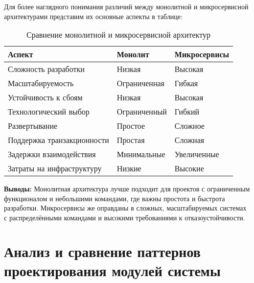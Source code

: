 Для более наглядного понимания различий между монолитной и микросервисной архитектурами представим их основные аспекты в таблице:

\begin{table}[H]
\centering
\begin{tabular}{|l|l|l|}
\hline
\textbf{Аспект}                & \textbf{Монолит}       & \textbf{Микросервисы}   \\ \hline
Сложность разработки           & Низкая                                 & Высокая                                \\ \hline
Масштабируемость               & Ограниченная                           & Гибкая                                 \\ \hline
Устойчивость к сбоям           & Низкая                                 & Высокая                                \\ \hline
Технологический выбор          & Ограниченный                           & Гибкий                                 \\ \hline
Развертывание                  & Простое                                & Сложное                                \\ \hline
Поддержка транзакционности     & Простая                                & Сложная                                \\ \hline
Задержки взаимодействия        & Минимальные                            & Увеличенные                            \\ \hline
Затраты на инфраструктуру      & Низкие                                 & Высокие                                \\ \hline
\end{tabular}
\caption{Сравнение монолитной и микросервисной архитектур}
\end{table}

\textbf{Выводы:} Монолитная архитектура лучше подходит для проектов с ограниченным функционалом и небольшими командами, где важны простота и быстрота разработки. Микросервисы же оправданы в сложных, масштабируемых системах с распределёнными командами и высокими требованиями к отказоустойчивости.













\section{Анализ и сравнение паттернов проектирования модулей системы}

